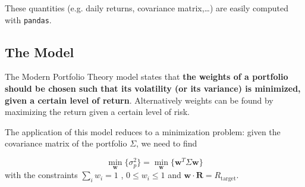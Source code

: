These quantities (e.g. daily returns, covariance matrix,\ldots) are easily computed with \texttt{pandas}.

%
%

\subsection{The Model}
\label{optimization}

The Modern Portfolio Theory model states that \textbf{the weights of a portfolio should be chosen such that its volatility (or its variance) is minimized, given a certain level of return}. Alternatively weights can be found by maximizing the return given a certain level of risk.

The application of this model reduces to a minimization problem: given the covariance matrix of the portfolio $\Sigma$, we need to find

\begin{equation}
\underset{\mathbf{w}}{\min}\{\sigma_p^2\} = \underset{\mathbf{w}}{\min}\{\mathbf{w}^T\Sigma\mathbf{w}\}
\end{equation}
with the constraints $\sum_{i}w_i = 1$ , $0 \le w_i \le 1$ and $\mathbf{w}\cdot\mathbf{R}=R_{\textrm{target}}$.

